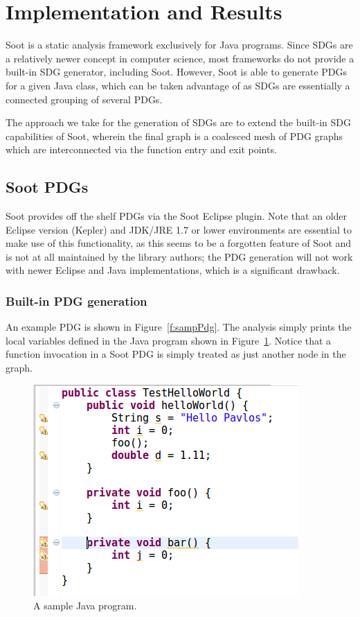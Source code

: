 \documentclass[authoryear,preprint]{sigplanconf}
\begin{document}
\section{Implementation and Results}
\label{sec:introduction}

Soot is a static analysis framework exclusively for Java programs. Since SDGs are a relatively newer concept in computer science, most frameworks do not provide a built-in SDG generator, including Soot. However, Soot is able to generate PDGs for a given Java class, which can be taken advantage of as SDGs are essentially a connected grouping of several PDGs.

The approach we take for the generation of SDGs are to extend the built-in SDG capabilities of Soot, wherein the final graph is a coalesced mesh of PDG graphs which are interconnected via the function entry and exit points.

\subsection{Soot PDGs}
\label{sec:some_section}

Soot provides off the shelf PDGs via the Soot Eclipse plugin. Note that an older Eclipse version (Kepler) and JDK/JRE 1.7 or lower environments are essential to make use of this functionality, as this seems to be a forgotten feature of Soot and is not at all maintained by the library authors; the PDG generation will not work with newer Eclipse and Java implementations, which is a significant drawback.

\subsubsection{Built-in PDG generation}

An example PDG is shown in Figure~\ref{f:sampPdg}. The analysis simply prints the local variables defined in the Java program shown in Figure~\ref{f:sampProg}. Notice that a function invocation in a Soot PDG is simply treated as just another node in the graph.

\begin{figure}[ht]
	\centering
	\includegraphics[width=.9\linewidth]{figures/Selection_078}
	\caption[A sample Java program]{\label{f:sampProg}A sample Java program.}
\end{figure}
\end{document}
